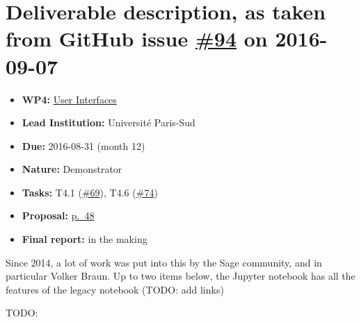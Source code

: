 \section*{\texorpdfstring{Deliverable description, as taken from GitHub
issue
\href{https://github.com/OpenDreamKit/OpenDreamKit/issues/94}{\#94} on
2016-09-07}{Deliverable description, as taken from GitHub issue \#94 on 2016-09-07}}\label{deliverable-description-as-taken-from-github-issues-94-on-2016-09-07}

\begin{itemize}
\tightlist
\item
  \textbf{WP4:}
  \href{https://github.com/OpenDreamKit/OpenDreamKit/tree/master/WP4}{User
  Interfaces}
\item
  \textbf{Lead Institution:} Université Paris-Sud
\item
  \textbf{Due:} 2016-08-31 (month 12)
\item
  \textbf{Nature:} Demonstrator
\item
  \textbf{Tasks:} T4.1
  (\href{https://github.com/OpenDreamKit/OpenDreamKit/issues/69}{\#69}),
  T4.6
  (\href{https://github.com/OpenDreamKit/OpenDreamKit/issues/74}{\#74})
\item
  \textbf{Proposal:}
  \href{https://github.com/OpenDreamKit/OpenDreamKit/raw/master/Proposal/proposal-www.pdf}{p.~48}
\item
  \textbf{Final report:} in the making
\end{itemize}

Since 2014, a lot of work was put into this by the Sage community, and
in particular Volker Braun. Up to two items below, the Jupyter notebook
has all the features of the legacy notebook (TODO: add links)

TODO:

